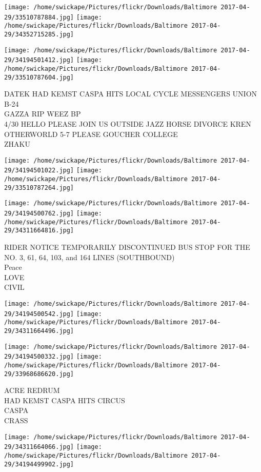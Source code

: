 \documentclass[10pt,letterpaper]{article}
\begin{document}
\texttt{[image: /home/swickape/Pictures/flickr/Downloads/Baltimore 2017-04-29/33510787884.jpg]}
\texttt{[image: /home/swickape/Pictures/flickr/Downloads/Baltimore 2017-04-29/34352715285.jpg]}

\texttt{[image: /home/swickape/Pictures/flickr/Downloads/Baltimore 2017-04-29/34194501412.jpg]}
\texttt{[image: /home/swickape/Pictures/flickr/Downloads/Baltimore 2017-04-29/33510787604.jpg]}

DATEK HAD KEMST CASPA HITS LOCAL CYCLE MESSENGERS UNION B{-}24\\
GAZZA RIP WEEZ BP\\
4/30 HELLO PLEASE JOIN US OUTSIDE JAZZ HORSE DIVORCE KREN OTHERWORLD 5{-}7 PLEASE GOUCHER COLLEGE\\
ZHAKU
\pagebreak

\texttt{[image: /home/swickape/Pictures/flickr/Downloads/Baltimore 2017-04-29/34194501022.jpg]}
\texttt{[image: /home/swickape/Pictures/flickr/Downloads/Baltimore 2017-04-29/33510787264.jpg]}

\texttt{[image: /home/swickape/Pictures/flickr/Downloads/Baltimore 2017-04-29/34194500762.jpg]}
\texttt{[image: /home/swickape/Pictures/flickr/Downloads/Baltimore 2017-04-29/34311664816.jpg]}

RIDER NOTICE TEMPORARILY DISCONTINUED BUS STOP FOR THE NO. 3, 61, 64, 103, and 164 LINES (SOUTHBOUND)\\
Peace\\
LOVE\\
CIVIL
\pagebreak

\texttt{[image: /home/swickape/Pictures/flickr/Downloads/Baltimore 2017-04-29/34194500542.jpg]}
\texttt{[image: /home/swickape/Pictures/flickr/Downloads/Baltimore 2017-04-29/34311664496.jpg]}

\texttt{[image: /home/swickape/Pictures/flickr/Downloads/Baltimore 2017-04-29/34194500332.jpg]}
\texttt{[image: /home/swickape/Pictures/flickr/Downloads/Baltimore 2017-04-29/33968686620.jpg]}

ACRE REDRUM\\
HAD KEMST CASPA HITS CIRCUS\\
CASPA\\
CRASS
\pagebreak

\texttt{[image: /home/swickape/Pictures/flickr/Downloads/Baltimore 2017-04-29/34311664066.jpg]}
\texttt{[image: /home/swickape/Pictures/flickr/Downloads/Baltimore 2017-04-29/34194499902.jpg]}
\end{document}
